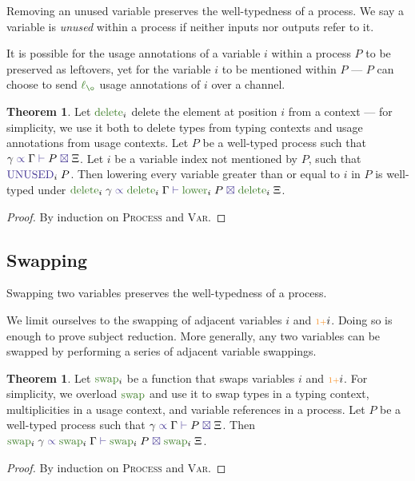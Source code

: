 \documentclass[a4paper,UKenglish,cleveref,autoref,thm-restate,authorcolumns]{lipics-v2019}
\theoremstyle{definition}
\newtheorem{nitheorem}[theorem]{Theorem}
\newcommand{\type}[1]{\textcolor{BlueViolet}{\operatorname{#1}}}
\newcommand{\constr}[1]{\textcolor{BurntOrange}{\operatorname{#1}}}
\newcommand{\func}[1]{\textcolor{OliveGreen}{\operatorname{#1}}}
\newcommand{\suc}{\constr{\scriptstyle 1+}}
\newcommand{\lz}{\func{\ell_{\o}}}
\newcommand{\types}[4]{#1 \; \type{\propto} \; #2 \; \type{\vdash} \; #3 \; \type{\boxtimes} \; #4}
\newcommand{\Unused}{\type{UNUSED}}
\begin{document}
Removing an unused variable preserves the well-typedness of a process.
We say a variable is \emph{unused} within a process if neither inputs nor outputs refer to it.

\begin{remark}
  It is possible for the usage annotations of a variable $i$ within a process $P$ to be preserved as leftovers, yet for the variable $i$ to be mentioned within $P$ --- $P$ can choose to send $\lz$ usage annotations of $i$ over a channel.
\end{remark}

\begin{nitheorem}
  \label{thm:strengthening}
  Let $\func{delete}_i$ delete the element at position $i$ from a context --- for simplicity, we use it both to delete types from typing contexts and usage annotations from usage contexts.
  Let $P$ be a well-typed process such that $\types{\gamma}{\Gamma}{P}{\Xi}$.
  Let $i$ be a variable index not mentioned by $P$, such that $\Unused_i \; P$.
  Then lowering every variable greater than or equal to $i$ in $P$ is well-typed under $\types{\func{delete}_i \; \gamma}{\func{delete}_i \; \Gamma}{\func{lower}_i \; P}{\func{delete}_i \; \Xi}$.
\end{nitheorem}
\begin{proof}
  By induction on \textsc{Process} and \textsc{Var}.
\end{proof}

\subsection{Swapping}
\label{swapping}

Swapping two variables preserves the well-typedness of a process.

\begin{remark}
  We limit ourselves to the swapping of adjacent variables $i$ and $\suc i$.
  Doing so is enough to prove subject reduction.
  More generally, any two variables can be swapped by performing a series of adjacent variable swappings.
\end{remark}

\begin{nitheorem}
  \label{thm:swapping}
  Let $\func{swap}_i$ be a function that swaps variables $i$ and $\suc i$.
  For simplicity, we overload $\func{swap}$ and use it to swap types in a typing context, multiplicities in a usage context, and variable references in a process.
  \todo{}
  Let $P$ be a well-typed process such that $\types{\gamma}{\Gamma}{P}{\Xi}$.
  Then $\types{\func{swap}_i \; \gamma}{\func{swap}_i \; \Gamma}{\func{swap}_i \; P}{\func{swap}_i \; \Xi}$.
\end{nitheorem}
\begin{proof}
  By induction on \textsc{Process} and \textsc{Var}.
\end{proof}
\end{document}
